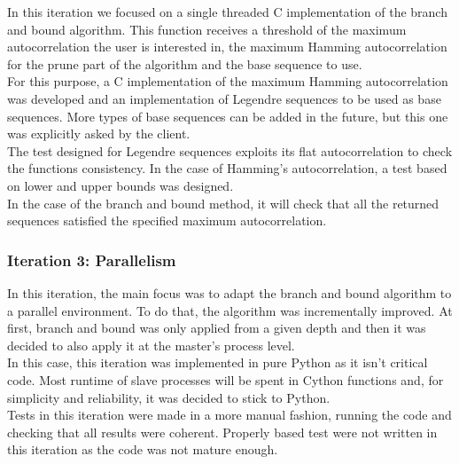       In this iteration we focused on a single threaded C implementation of the
      branch and bound algorithm. This function receives a threshold of the
      maximum autocorrelation the user is interested in, the maximum Hamming
      autocorrelation for the prune part of the algorithm and the base sequence
      to use.\\

      For this purpose, a C implementation of the maximum Hamming
      autocorrelation was developed and an implementation of Legendre sequences
      to be used as base sequences. More types of base sequences can be added
      in the future, but this one was explicitly asked by the client.\\

      The test designed for Legendre sequences exploits its flat
      autocorrelation to check the functions consistency. In the case of
      Hamming's autocorrelation, a test based on lower and upper
      bounds was designed.\\

      In the case of the branch and bound method, it will check that all the
      returned sequences satisfied the specified maximum autocorrelation.\\

      \subsubsection{Iteration 3: Parallelism}

      In this iteration, the main focus was to adapt the branch and bound algorithm
      to a parallel environment. To do that, the algorithm was incrementally
      improved. At first, branch and bound was only applied from a given depth and
      then it was decided to also apply it at the master's process level.\\

      In this case, this iteration was implemented in pure Python as it isn't
      critical code. Most runtime of slave processes will be spent in Cython
      functions and, for simplicity and reliability, it was decided to stick to
      Python.\\

      Tests in this iteration were made in a more manual fashion, running the
      code and checking that all results were coherent. Properly based test were not written in this iteration as the code was not mature enough.\\


